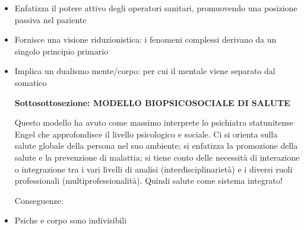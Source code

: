 \documentclass[]{article}
\begin{document}
\begin{itemize}
\item
  Enfatizza il potere attivo degli operatori sanitari, promuovendo una
  posizione passiva nel paziente
\item
  Fornisce una visione riduzionistica: i fenomeni complessi derivano da
  un singolo principio primario
\item
  Implica un dualismo mente/corpo: per cui il mentale viene separato dal
  somatico

  \textbf{Sottosottosezione: MODELLO BIOPSICOSOCIALE DI SALUTE}

  Questo modello ha avuto come massimo interprete lo psichiatra
  statunitense Engel che approfondisce il livello psicologico e sociale.
  Ci si orienta sulla salute globale della persona nel suo ambiente; si
  enfatizza la promozione della salute e la prevenzione di malattia; si
  tiene conto delle necessità di interazione o integrazione tra i vari
  livelli di analisi (interdisciplinarietà) e i diversi ruoli
  professionali (multiprofessionalità). Quindi salute come sistema
  integrato!

  Conseguenze:
\end{itemize}

\begin{itemize}
\item
  Psiche e corpo sono indivisibili
\end{itemize}
\end{document}
